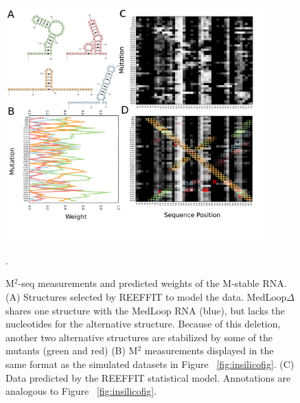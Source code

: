 \documentclass[12pt]{article}
\begin{document}
\begin{figure}[here]
\includegraphics[width=0.9\textwidth]{figures/mstable.png}
\caption{M$^2$-seq measurements and predicted weights of the M-stable RNA. (A) Structures selected by REEFFIT to model the data. MedLoop$\Delta$ shares one structure with the MedLoop RNA (blue), but lacks the nucleotides for the alternative structure. Because of this deletion, another two alternative structures are stabilized by some of the mutants (green and red) (B) M$^2$ measurements displayed in the same format as the simulated datasets in Figure ~\ref{fig:insilicofig}. (C) Data predicted by the REEFFIT statistical model. Annotations are analogous to Figure ~\ref{fig:insilicofig}.}.
\label{fig:mstablefig}
\end{figure}


\end{document}
